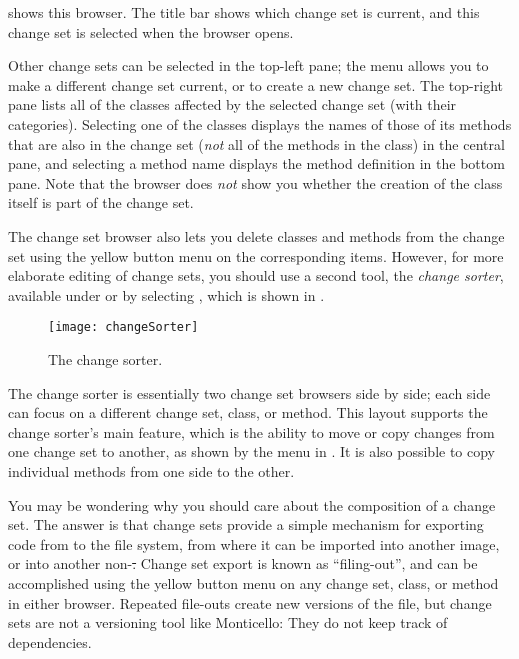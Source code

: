 \documentclass[a4paper,10pt,twoside]{book}
\begin{document}
 shows this browser.
The title bar shows which change set is current, and this change set is selected when the browser opens.

Other change sets can be selected in the top-left pane; the  menu allows you to make a different change set current, or to create a new change set.
The top-right pane lists all of the classes affected by the selected change set (with their categories).
Selecting one of the classes displays the names of those of its methods that are also in the change set (\emph{not} all of the methods in the class) in the central pane, and selecting a method name displays the method definition in the bottom pane.
Note that the browser does \emph{not} show you whether the creation of the class itself is part of the change set.

The change set browser also lets you delete classes and methods from the change set using the yellow button menu on the corresponding items.
However, for more elaborate editing of change sets, you should use a second tool, the \textit{change sorter}, available under  or by selecting , which is shown in .

\begin{figure}[btp]
	\begin{center}
		\texttt{[image: changeSorter]}
	\end{center}
	\caption{The change sorter.}
	\label{fig:changeSorter}
\end{figure}

The change sorter is essentially two change set browsers side by side; each side can focus on a different change set, class, or method.
This layout supports the change sorter's main feature, which is the ability to move or copy changes from one change set to another, as shown by the  menu in .
It is also possible to copy individual methods from one side to the other.

You may be wondering why you should care about the composition of a change set.
The answer is that change sets provide a simple mechanism for exporting code from \sq to the file system, from where it can be imported into another \sq image, or into another non-\sq \st.
Change set export is known as ``filing-out'', and can be accomplished using the yellow button menu on any change set, class, or method in either browser.
Repeated file-outs create new versions of the file, but change sets are not a versioning tool like Monticello:
They do not keep track of dependencies.
\end{document}
